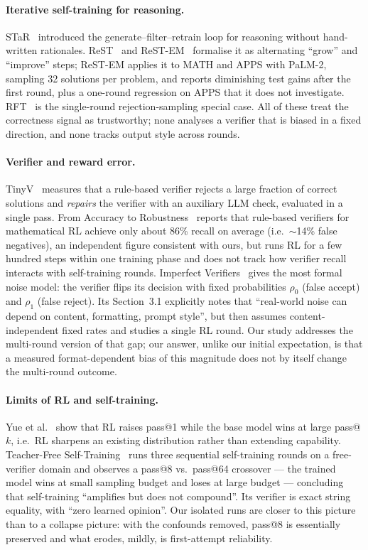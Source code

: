 \documentclass[runningheads]{llncs}
\begin{document}
\paragraph{Iterative self-training for reasoning.}
STaR~\cite{ref_star} introduced the generate--filter--retrain loop for
reasoning without hand-written rationales. ReST~\cite{ref_rest} and
ReST-EM~\cite{ref_restem} formalise it as alternating ``grow'' and
``improve'' steps; ReST-EM applies it to MATH and APPS with PaLM-2,
sampling 32 solutions per problem, and reports diminishing test gains after
the first round, plus a one-round regression on APPS that it does not
investigate. RFT~\cite{ref_rft} is the single-round rejection-sampling
special case. All of these treat the correctness signal as trustworthy;
none analyses a verifier that is biased in a fixed direction, and none
tracks output style across rounds.

\paragraph{Verifier and reward error.}
TinyV~\cite{ref_tinyv} measures that a rule-based verifier rejects a large
fraction of correct solutions and \emph{repairs} the verifier with an
auxiliary LLM check, evaluated in a single pass. From Accuracy to
Robustness~\cite{ref_robustness} reports that rule-based verifiers for
mathematical RL achieve only about 86\% recall on average (i.e.\ $\sim$14\%
false negatives), an independent figure consistent with ours, but runs RL
for a few hundred steps within one training phase and does not track how
verifier recall interacts with self-training rounds. Imperfect
Verifiers~\cite{ref_imperfect} gives the most formal noise model: the
verifier flips its decision with fixed probabilities $\rho_0$ (false
accept) and $\rho_1$ (false reject). Its Section~3.1 explicitly notes that
``real-world noise can depend on content, formatting, prompt style'', but
then assumes content-independent fixed rates and studies a single RL round.
Our study addresses the multi-round version of that gap; our answer, unlike
our initial expectation, is that a measured format-dependent bias of this
magnitude does not by itself change the multi-round outcome.

\paragraph{Limits of RL and self-training.}
Yue et al.~\cite{ref_rllimit} show that RL raises pass@1 while the base
model wins at large pass@$k$, i.e.\ RL sharpens an existing distribution
rather than extending capability. Teacher-Free
Self-Training~\cite{ref_teacherfree} runs three sequential self-training
rounds on a free-verifier domain and observes a pass@8 vs.\ pass@64
crossover --- the trained model wins at small sampling budget and loses at
large budget --- concluding that self-training ``amplifies but does not
compound''. Its verifier is exact string equality, with ``zero learned
opinion''. Our isolated runs are closer to this picture than to a collapse
picture: with the confounds removed, pass@8 is essentially preserved and
what erodes, mildly, is first-attempt reliability.
\end{document}
